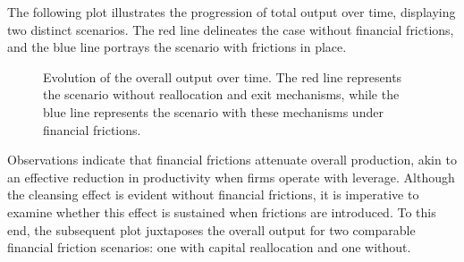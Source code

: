 \documentclass[12pt]{article}
\begin{document}
The following plot illustrates the progression of total output over time, displaying two distinct scenarios. The red
line delineates  the case without financial frictions, and the blue line portrays the scenario with frictions in place.

\begin{figure}[H]
    \centering
    \caption{Evolution of the overall output over time. The red line represents the scenario without reallocation and
    exit mechanisms, 
     while the blue line represents the scenario with these mechanisms under financial frictions.}
    \label{fig:output_evolution_frictions}
\end{figure}

Observations indicate that financial frictions attenuate overall production, akin to an effective reduction in
productivity when  firms operate with leverage. Although the cleansing effect is evident without financial frictions, it
is imperative to examine whether this effect is sustained when frictions are introduced. To this end, the subsequent plot
juxtaposes the overall output for two comparable financial friction scenarios: one with capital reallocation and one
without.
\end{document}
